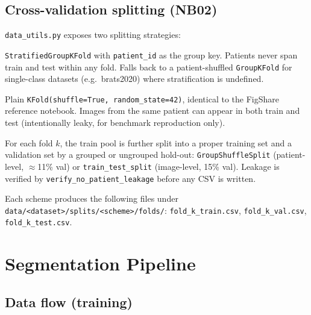 \documentclass[12pt,a4paper]{article}
\begin{document}
\subsection{Cross-validation splitting (NB02)}

\texttt{data\_utils.py} exposes two splitting strategies:

\begin{description}[leftmargin=2em]
  \item[Patient-level (\texttt{patient\_level})]
    \texttt{StratifiedGroupKFold} with \texttt{patient\_id} as the group key.
    Patients never span train and test within any fold.  Falls back to a
    patient-shuffled \texttt{GroupKFold} for single-class datasets (e.g.\
    brats2020) where stratification is undefined.

  \item[Image-level (\texttt{image\_level})]
    Plain \texttt{KFold(shuffle=True, random\_state=42)}, identical to the
    FigShare reference notebook.  Images from the same patient can appear in
    both train and test (intentionally leaky, for benchmark reproduction only).
\end{description}

For each fold $k$, the train pool is further split into a proper training set
and a validation set by a grouped or ungrouped hold-out:
\texttt{GroupShuffleSplit} (patient-level, $\approx$11\% val) or
\texttt{train\_test\_split} (image-level, 15\% val).
Leakage is verified by \texttt{verify\_no\_patient\_leakage} before any CSV is
written.

Each scheme produces the following files under
\texttt{data/<dataset>/splits/<scheme>/folds/}:
\texttt{fold\_k\_train.csv}, \texttt{fold\_k\_val.csv}, \texttt{fold\_k\_test.csv}.

\section{Segmentation Pipeline}

\subsection{Data flow (training)}
\end{document}
